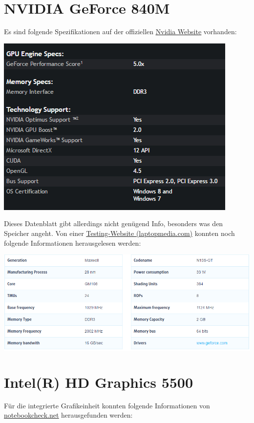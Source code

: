 \clearpage
\section{NVIDIA GeForce 840M}
Es sind folgende Spezifikationen auf der offiziellen \underline{\href{https://www.geforce.com/hardware/notebook-gpus/geforce-840m/specifications}{Nvidia Website}} vorhanden:

\begin{minipage}{\linewidth}
	\centering
	\includegraphics[width=0.8\linewidth]{images/nvidia_specs}
\end{minipage}

Dieses Datenblatt gibt allerdings nicht genügend Info, besonders was den Speicher angeht. Von einer \underline{\href{http://laptopmedia.com/video-card/nvidia-geforce-840m-2gb-ddr3/}{Testing-Website (laptopmedia.com)}} konnten noch folgende Informationen herausgelesen werden:

\begin{minipage}{\linewidth}
	\centering
	\includegraphics[width=0.8\linewidth]{images/specs}
\end{minipage}

\section{Intel(R) HD Graphics 5500}
Für die integrierte Grafikeinheit konnten folgende Informationen von \underline{\href{https://www.notebookcheck.net/Intel-HD-Graphics-5500.125586.0.html}{notebookcheck.net}} herausgefunden werden:
	
